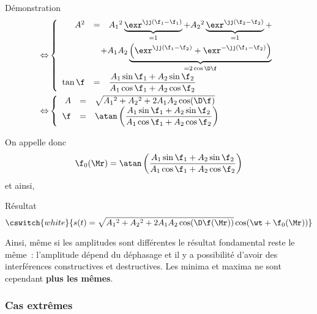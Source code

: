 \documentclass[../main/main.tex]{subfiles}
\begin{document}
\begin{rdemoside}{Démonstration}
{\begin{gather*}
\begin{aligned}
            \Leftrightarrow &
            \left\{
                \begin{array}{rcl}
                    A^2 & = & A_1{}^2
                        \underbrace{\exr^{\jj(\f_1-\f_1)}}_{=1} +
                        A_2{}^2
                        \underbrace{\exr^{\jj(\f_2-\f_2)}}_{=1} +
                        \\[1.5em]
                      &&\hspace{-0.33cm}+ A_1A_2
                    \underbrace{\left(
                        \exr^{\jj(\f_1-\f_2)} + \exr^{-\jj(\f_1-\f_2)}
                \right)}_{=2\cos\D\f}\\[2em]
                    \tan\f & = &
                        \dfrac{A_1\sin\f_1+A_2\sin\f_2}
                        {A_1\cos\f_1+A_2\cos\f_2}
                \end{array}
            \right.\\
            \Leftrightarrow &
            \left\{
                \begin{array}{rcl}
                    A & = & \sqrt{A_1{}^2+A_2{}^2 + 2A_1A_2\cos(\D\f)}\\
                    \f & = & \atan
                        \left(
                            \dfrac{A_1\sin\f_1+A_2\sin\f_2}{A_1\cos\f_1+A_2\cos\f_2}
                        \right)
                \end{array}
            \right.
        \end{aligned}
    \end{gather*}}
    \hspace{-20pt}

    On appelle donc
    \[\f_0(\Mr) =
        \atan
            \left(
                \dfrac{A_1\sin\f_1+A_2\sin\f_2}{A_1\cos\f_1+A_2\cos\f_2}
            \right)
    \]
    et ainsi,
\end{rdemoside}
\begin{bprop}{Résultat}
    \[\cswitch{white}{
        s(t) = \sqrt{A_1{}^2+A_2{}^2 + 2A_1A_2\cos(\D\f(\Mr))}\cos(\wt+\f_0(\Mr))
    }\]
\end{bprop}

Ainsi, même si les amplitudes sont différentes le résultat fondamental reste le
même~: l'amplitude dépend du déphasage et il y a possibilité d'avoir des
interférences constructives et destructives. Les minima et maxima ne sont
cependant \textbf{plus les mêmes}.

\subsubsection{Cas extrêmes}
\end{document}
